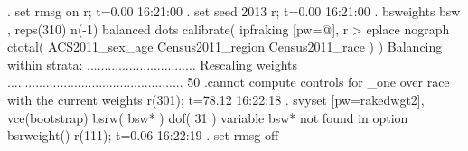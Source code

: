 {\smallskip}
. set rmsg on
r; t=0.00 16:21:00
{\smallskip}
. set seed 2013
r; t=0.00 16:21:00
{\smallskip}
. bsweights bsw , reps(310) n(-1) balanced dots  calibrate( ipfraking [pw=@], r
> eplace nograph ctotal( ACS2011_sex_age Census2011_region Census2011_race ) )
Balancing within strata: 
...............................
{\smallskip}
Rescaling weights 
..................................................    50
.cannot compute controls for _one over race with the current weights
r(301); t=78.12 16:22:18
{\smallskip}
. svyset [pw=rakedwgt2], vce(bootstrap) bsrw( bsw* ) dof( 31 )
variable bsw* not found
in option bsrweight()
r(111); t=0.06 16:22:19
{\smallskip}
. set rmsg off
